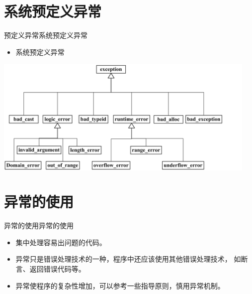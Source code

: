 \section[预定义异常]{系统预定义异常}\label{sec:chap10-sec06}
\begin{frame}[t, fragile]{预定义异常}{系统预定义异常}%
  \begin{itemize}
  \item 系统预定义异常
  \end{itemize}
  \begin{center}
    \includegraphics[width=0.95\textwidth]{figure/chap10/01trycatchclass}
  \end{center}
\end{frame}

\section[异常的使用]{异常的使用}\label{sec:chap10-sec07}
\begin{frame}[t, fragile]{异常的使用}{异常的使用}%
  \stretchon
  \begin{itemize}
  \item 集中处理容易出问题的代码。
  \item 异常只是错误处理技术的一种，程序中还应该使用其他错误处理技术，
    如断言、返回错误代码等。
  \item 异常使程序的复杂性增加，可以参考一些指导原则，慎用异常机制。
  \end{itemize}
  \stretchoff
\end{frame}

